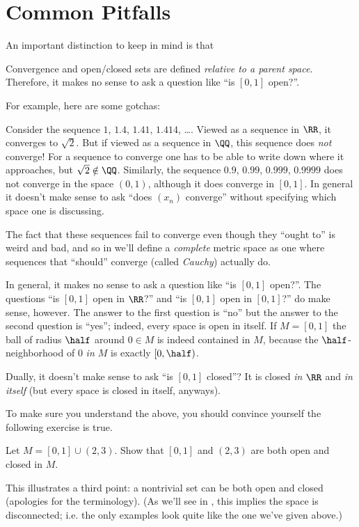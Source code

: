 \section{Common Pitfalls}
An important distinction to keep in mind is that
\begin{moral}
	Convergence and open/closed sets are defined \emph{relative to a parent space}.
	Therefore, it makes no sense to ask a question like ``is $[0,1]$ open?''.
\end{moral}
For example, here are some gotchas:
\begin{itemize}
	\ii Consider the sequence $1$, $1.4$, $1.41$, $1.414$, \dots.
	Viewed as a sequence in $\RR$, it converges to $\sqrt 2$.
	But if viewed as a sequence in $\QQ$, this sequence does \emph{not} converge!
	For a sequence to converge one has to be able to write down where it approaches,
	but $\sqrt 2 \notin \QQ$.
	Similarly, the sequence $0.9$, $0.99$, $0.999$, $0.9999$ does not converge in the space $(0,1)$,
	although it does converge in $[0,1]$.
	In general it doesn't make sense to ask
	``does $(x_n)$ converge'' without specifying which space one is discussing.

	The fact that these sequences fail to converge even though they ``ought to'' is weird and bad,
	and so in  we'll define a \emph{complete} metric space as one where sequences
	that ``should'' converge (called \emph{Cauchy}) actually do.

	\ii In general, it makes no sense to ask a question like ``is $[0,1]$ open?''.
	The questions ``is $[0,1]$ open in $\RR$?'' and ``is $[0,1]$ open in $[0,1]$?'' do make sense, however.
	The answer to the first question is ``no'' but the answer to the second question is ``yes'';
	indeed, every space is open in itself.
	If $M = [0,1]$ the ball of radius $\half$ around $0 \in M$ is indeed contained in $M$,
	because the $\half$-neighborhood of $0$ \emph{in $M$} is exactly $[0,\half)$.

	\ii Dually, it doesn't make sense to ask ``is $[0,1]$ closed''?
	It is closed \emph{in $\RR$} and \emph{in itself} (but every space is closed in itself, anyways).
\end{itemize}

To make sure you understand the above, you should convince yourself the following exercise is true.
\begin{exercise}
	Let $M = [0,1] \cup (2,3)$.
	Show that $[0,1]$ and $(2,3)$ are both open and closed in $M$.
\end{exercise}
This illustrates a third point:
a nontrivial set can be both open and closed (apologies for the terminology).
(As we'll see in , this implies the space is disconnected; i.e. the only
examples look quite like the one we've given above.)


